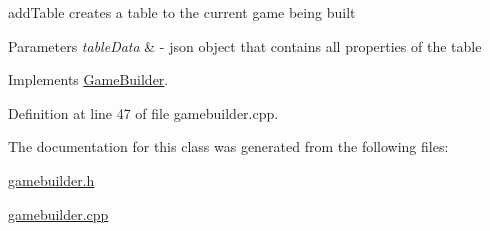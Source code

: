 add\+Table creates a table to the current game being built 


\begin{DoxyParams}{Parameters}
{\em table\+Data} & -\/ json object that contains all properties of the table \\
\hline
\end{DoxyParams}


Implements \mbox{\hyperlink{class_game_builder_a65fb629009c18956a8d592352eda1eb5}{Game\+Builder}}.



Definition at line 47 of file gamebuilder.\+cpp.



The documentation for this class was generated from the following files\+:\begin{DoxyCompactItemize}
\item 
\mbox{\hyperlink{gamebuilder_8h}{gamebuilder.\+h}}\item 
\mbox{\hyperlink{gamebuilder_8cpp}{gamebuilder.\+cpp}}\end{DoxyCompactItemize}
